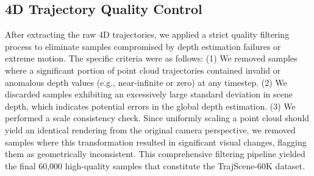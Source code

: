 \subsection{4D Trajectory Quality Control}

After extracting the raw 4D trajectories, we applied a strict quality filtering process to eliminate samples compromised by depth estimation failures or extreme motion. The specific criteria were as follows: (1) We removed samples where a significant portion of point cloud trajectories contained invalid or anomalous depth values (e.g., near-infinite or zero) at any timestep. (2) We discarded samples exhibiting an excessively large standard deviation in scene depth, which indicates potential errors in the global depth estimation. (3) We performed a scale consistency check. Since uniformly scaling a point cloud should yield an identical rendering from the original camera perspective, we removed samples where this transformation resulted in significant visual changes, flagging them as geometrically inconsistent. This comprehensive filtering pipeline yielded the final 60,000 high-quality samples that constitute the TrajScene-60K dataset.



